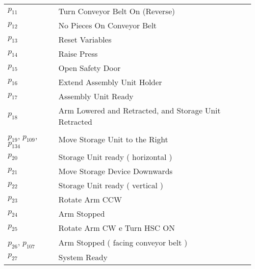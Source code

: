 \begin{longtable}{M{5cm}M{10cm}}
\hyperlink{completeNet:p11}{\hypertarget{completeTable:p11}{$p_{11}$}} & Turn Conveyor Belt On (Reverse)\\
\hyperlink{completeNet:p12}{\hypertarget{completeTable:p12}{$p_{12}$}} & No Pieces On Conveyor Belt\\
\hyperlink{completeNet:p13}{\hypertarget{completeTable:p13}{$p_{13}$}} & Reset Variables\\
\hyperlink{completeNet:p14}{\hypertarget{completeTable:p14}{$p_{14}$}} & Raise Press\\
\hyperlink{completeNet:p15}{\hypertarget{completeTable:p15}{$p_{15}$}} & Open Safety Door\\
\hyperlink{completeNet:p16}{\hypertarget{completeTable:p16}{$p_{16}$}} & Extend Assembly Unit Holder\\
\hyperlink{completeNet:p17}{\hypertarget{completeTable:p17}{$p_{17}$}} & Assembly Unit Ready\\
\hyperlink{completeNet:p18}{\hypertarget{completeTable:p18}{$p_{18}$}} & Arm Lowered and Retracted, and Storage Unit Retracted\\
\hyperlink{completeNet:p19}{\hypertarget{completeTable:p19}{$p_{19}$}}, \hyperlink{completeNet:p109}{\hypertarget{completeTable:p109}{$p_{109}$}}, \hyperlink{completeNet:p134}{\hypertarget{completeTable:p134}{$p_{134}$}} & Move Storage Unit to the Right\\
\hyperlink{completeNet:p20}{\hypertarget{completeTable:p20}{$p_{20}$}} & Storage Unit ready ( horizontal )\\
\hyperlink{completeNet:p21}{\hypertarget{completeTable:p21}{$p_{21}$}} & Move Storage Device Downwards\\
\hyperlink{completeNet:p22}{\hypertarget{completeTable:p22}{$p_{22}$}} & Storage Unit ready ( vertical )\\
\hyperlink{completeNet:p23}{\hypertarget{completeTable:p23}{$p_{23}$}} & Rotate Arm CCW\\
\hyperlink{completeNet:p24}{\hypertarget{completeTable:p24}{$p_{24}$}} & Arm Stopped\\
\hyperlink{completeNet:p25}{\hypertarget{completeTable:p25}{$p_{25}$}} & Rotate Arm CW e Turn HSC ON\\
\hyperlink{completeNet:p26}{\hypertarget{completeTable:p26}{$p_{26}$}}, \hyperlink{completeNet:p107}{\hypertarget{completeTable:p107}{$p_{107}$}} & Arm Stopped ( facing conveyor belt )\\
\hyperlink{completeNet:p27}{\hypertarget{completeTable:p27}{$p_{27}$}} & System Ready\\

\end{longtable}
